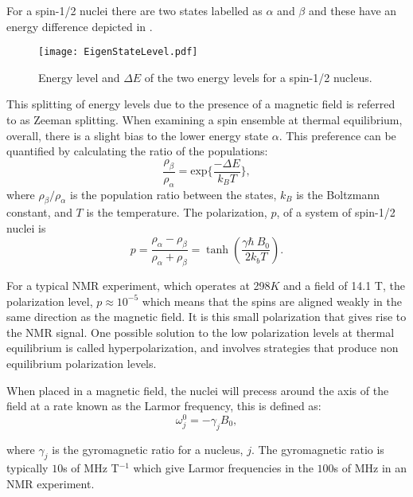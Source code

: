 For a spin-1/2 nuclei there are two states labelled as $\alpha$ and $\beta$
and these have an energy difference depicted in .

\begin{figure}[ht]
  \begin{center}
  \texttt{[image: EigenStateLevel.pdf]}
  \end{center}
  \caption{Energy level and $\Delta{E}$ of the two energy levels for a spin-1/2 nucleus.}
  \label{fig:EnergySplit}
\end{figure}

This splitting of energy levels due to the presence of a magnetic field is referred to as Zeeman splitting.
When examining a spin ensemble at thermal equilibrium, overall, there is a slight bias to the lower energy
state $\alpha$. This preference can be quantified by calculating the ratio of the populations:
\begin{equation}\label{eqn:Boltzmann}
  \frac{\rho_{\beta}}{\rho_{\alpha}} = \text{exp}\{\frac{-\Delta{E}}{k_B T}\},
\end{equation}
where $\rho_{\beta}/\rho_{\alpha}$ is the population ratio between the states, $k_B$ is the Boltzmann constant, and $T$ is the temperature. The polarization, $p$, of a system of
spin-1/2 nuclei is
\begin{equation}\label{eqn:Polarization}
  p = \frac{\rho_\alpha - \rho_\beta}{\rho_\alpha + \rho_\beta} = \tanh(\frac{\gamma\hbar~B_0}{2k_bT}).
\end{equation}

For a typical NMR experiment, which operates at 298$K$ and
a field of 14.1 T, the polarization level, $p \approx 10^{-5}$ which means that the spins are aligned weakly
in the same direction as the magnetic field. It is this small polarization that gives rise to the NMR
signal. One possible solution to the low polarization levels at thermal equilibrium is called hyperpolarization, and
involves strategies that produce non equilibrium polarization levels.

When placed in a magnetic field, the nuclei will precess around the axis of the field at a rate known as the Larmor frequency, this is defined as:
\begin{equation}\label{eqn:Larmor}
  \omega_j^0 = -\gamma_jB_0,
\end{equation}

where $\gamma_j$ is the gyromagnetic ratio for a nucleus, $j$. The gyromagnetic ratio is
typically $10$s of MHz T$^{-1}$ which give Larmor frequencies in the $100$s of MHz in an NMR
experiment.


